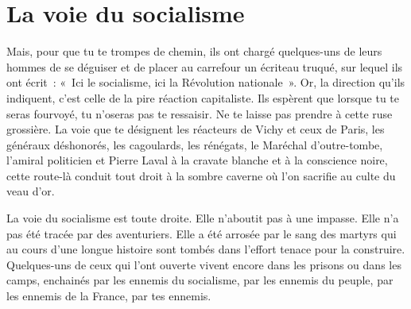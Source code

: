 \documentclass[french,twoside]{book} %
\begin{document}
\section[La voie du socialisme]{La voie du socialisme}
\noindent Mais, pour que tu te trompes de chemin, ils ont chargé quelques-uns de leurs hommes de se déguiser et de placer au carrefour un écriteau truqué, sur lequel ils ont écrit : « Ici le socialisme, ici la Révolution nationale ». Or, la direction qu’ils indiquent, c’est celle de la pire réaction capitaliste. Ils espèrent que lorsque tu te seras fourvoyé, tu n’oseras pas te ressaisir. Ne te laisse pas prendre à cette ruse grossière. La voie que te désignent les réacteurs de Vichy et ceux de Paris, les généraux déshonorés, les cagoulards, les rénégats, le Maréchal d’outre-tombe, l’amiral politicien et Pierre Laval à la cravate blanche et à la conscience noire, cette route-là conduit tout droit à la sombre caverne où l’on sacrifie au culte du veau d’or.\par
La voie du socialisme est toute droite. Elle n’aboutit pas à une impasse. Elle n’a pas été tracée par des aventuriers. Elle a été arrosée par le sang des martyrs qui au cours d’une longue histoire sont tombés dans l’effort tenace pour la construire. Quelques-uns de ceux qui l’ont ouverte vivent encore dans les prisons ou dans les camps, enchainés par les ennemis du socialisme, par les ennemis du peuple, par les ennemis de la France, par tes ennemis.
\end{document}
